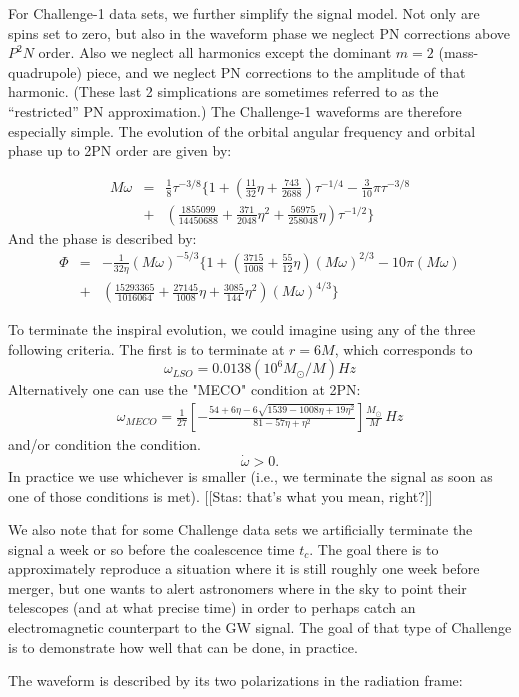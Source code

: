 \documentclass[11pt]{report}
\def\be{\begin{equation}}
\def\ee{\end{equation}}
\def\bea{\begin{eqnarray}}
\def\ena{\end{eqnarray}}
\begin{document}
For Challenge-1 data sets, we further simplify the signal model.  Not only are spins set to zero, but
also in the waveform phase we neglect PN corrections above $P^2N$ order. Also  
we neglect all harmonics except the dominant $m=2$ (mass-quadrupole) piece, and we neglect PN 
corrections to the amplitude of that harmonic. (These last 2 simplications are sometimes referred to as
the ``restricted'' PN approximation.)  The Challenge-1 waveforms are therefore especially simple.
The evolution of the orbital angular frequency 
and orbital phase up to 2PN order are given by:

\bea
M\omega &=& \frac{1}{8} \tau^{-3/8}\Biggl\{ 1 + \left( \frac{11}{32}\eta + \frac{743}{2688}\right) 
\tau^{-1/4} - \frac{3}{10}\pi\tau^{-3/8} \nonumber \\
& + & \left(\frac{1855099}{14450688} + \frac{371}{2048}\eta^2 
+ \frac{56975}{258048}\eta\right)
\tau^{-1/2}  \Biggr\}
\label{fr}
\ena
And the phase is described by:
\bea
\Phi &=& -\frac{1}{32\eta}(M\omega)^{-5/3}\Biggl\{ 1 + \left( \frac{3715}{1008} + \frac{55}{12}\eta\right)
(M\omega)^{2/3} - 10\pi(M\omega)  \nonumber \\
&+&  \left( \frac{15293365}{1016064} + \frac{27145}{1008}\eta + \frac{3085}{144}\eta^2\right)
(M\omega)^{4/3}\Biggr\}
\ena

To terminate the inspiral evolution, we could imagine using any of the three following criteria.
The first is to terminate at $r=6M$, which corresponds to 
\be
\omega_{LSO} = 0.0138(10^6M_{\odot}/M)Hz
\ee
Alternatively one can use the "MECO" condition at 2PN:
\bea
\omega_{MECO} = \frac1{27}\left[ 
-\frac{54 + 6\eta - 6\sqrt{1539 -1008\eta + 19\eta^2}}
{81 - 57\eta + \eta^2}\right]\frac{M_{\odot}}{M}\, Hz
\ena
and/or condition the condition.
$$
\dot{\omega} > 0.
$$
In practice we use whichever is smaller (i.e., we terminate the signal as soon as one of those
conditions is met). [[Stas: that's what you mean, right?]]

We also note that for some Challenge data sets we artificially terminate the signal 
a week or so before the coalescence time $t_c$. The goal there is to approximately reproduce a situation
where it is still roughly one week before merger, but one wants to alert astronomers where in the sky to
point their telescopes (and at what precise time) in order to perhaps catch an electromagnetic counterpart
to the GW signal. The goal of that type of Challenge is to demonstrate how well that can be done, in practice.

The waveform is described by its two polarizations in the
radiation frame:
\end{document}
